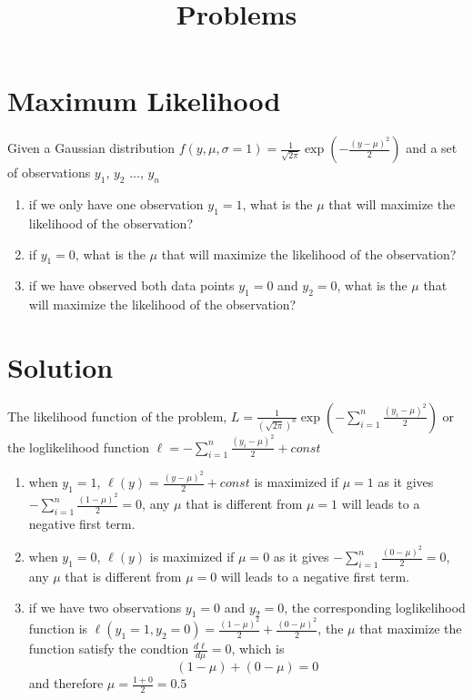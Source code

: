 \documentclass{article}
\title{Problems} %
\begin{document}
\maketitle %
\thispagestyle{fancy}
\pagestyle{fancy}

\section{Maximum Likelihood}

Given a Gaussian distribution $f(y,\mu, \sigma=1)=\frac{1}{\sqrt{2\pi}}\exp(-\frac{(y-\mu)^2}{2})$ and a set of observations $y_1$, $y_2$ ..., $y_n$

\begin{enumerate}
\item  if we only have one observation $y_1=1$, what is the $\mu$ that will maximize the likelihood of the observation?
\item  if $y_1=0$, what is the $\mu$ that will maximize the likelihood of the observation?
\item  if we have observed both data points $y_1=0$ and $y_2=0$, what is the $\mu$ that will maximize the likelihood of the observation?
\end{enumerate}

\section{Solution}
The likelihood function of the problem, $L=\frac{1}{(\sqrt{2\pi})^n}\exp\left( -\sum\limits_{i=1}^n\frac{(y_i-\mu)^2}{2}\right)$ or the loglikelihood function $\ell=-\sum\limits_{i=1}^n\frac{(y_i-\mu)^2}{2}+const$
\begin{enumerate}
\item when $y_1=1$, $\ell(y)=\frac{(y-\mu)^2}{2}+const$ is maximized if $\mu=1$ as it gives $-\sum\limits_{i=1}^n\frac{(1-\mu)^2}{2}=0$, any $\mu$ that is different from $\mu=1$ will leads to a negative first term.
\item when $y_1=0$, $\ell(y)$ is maximized if $\mu=0$ as it gives $-\sum\limits_{i=1}^n\frac{(0-\mu)^2}{2}=0$, any $\mu$ that is different from $\mu=0$ will leads to a negative first term.
\item  if we have two observations $y_1=0$ and $y_2=0$, the corresponding loglikelihood function is $\ell(y_1=1,y_2=0)=\frac{(1-\mu)^2}{2}+\frac{(0-\mu)^2}{2}$, the $\mu$ that maximize the function satisfy the condtion $\frac{d\ell}{d\mu}=0$, which is 
$$(1-\mu)+(0-\mu)=0$$ and therefore $\mu=\frac{1+0}{2}=0.5$
\end{enumerate}
\end{document}

